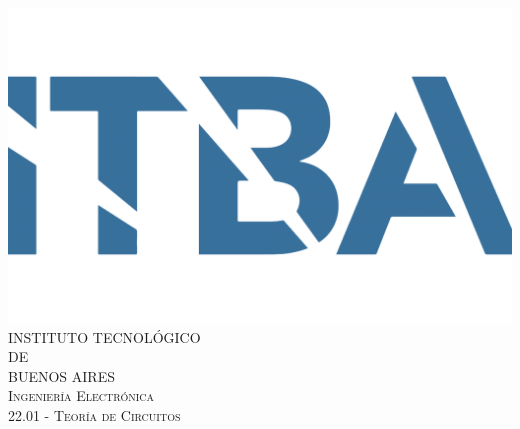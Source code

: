 \documentclass[12pt,a4paper]{article}
\begin{document}
\begin{titlepage}
\newcommand{\HRule}{\rule{\linewidth}{0.5mm}} %

\center

\includegraphics[scale = 0.15]{itba.png}\\[1cm] %
 

\textsc{\Large INSTITUTO TECNOLÓGICO \\DE \\[0.3cm]BUENOS AIRES }\\[0.6cm] %

\textsc{\Large Ingeniería Electrónica }\\[0.3cm]
\textsc{\large 22.01 - Teoría de Circuitos}\\[0.5cm] %



\end{titlepage}
\end{document}
